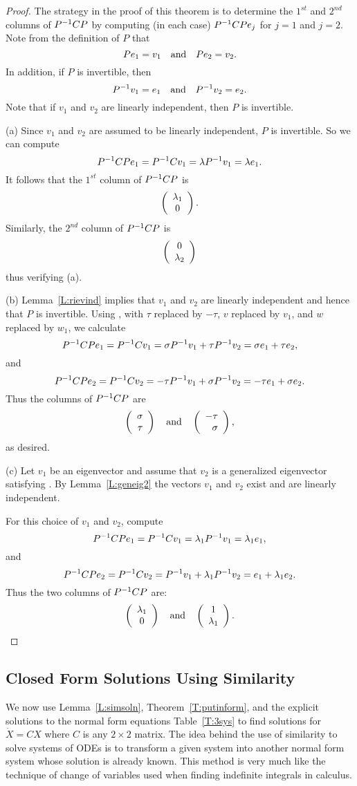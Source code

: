 \documentclass{ximera}
\begin{document}
\begin{proof}
The strategy in the proof of this theorem is to determine the
$1^{st}$ and $2^{nd}$ columns of $P^{-1} CP$ by computing (in each case)
$P^{-1} CPe_j$ for $j=1$ and $j=2$.  Note from the definition of $P$
that
\[
Pe_1 = v_1 \quad\mbox{and}\quad Pe_2 = v_2.
\]
In addition, if $P$ is invertible, then
\[
P^{-1} v_1 = e_1 \quad\mbox{and}\quad P^{-1} v_2 = e_2.
\]
Note that if $v_1$ and $v_2$ are linearly independent, then $P$ is invertible.

(a) \quad Since $v_1$ and $v_2$ are assumed to be linearly independent,
$P$ is invertible.  So we can compute
\[
P^{-1} CPe_1 = P^{-1} C v_1 = \lambda P^{-1} v_1 = \lambda e_1.
\]
It follows that the $1^{st}$ column of $P^{-1} CP$	is
\[
\left(\begin{array}{c} \lambda_1 \\ 0\end{array}\right).
\]
Similarly, the $2^{nd}$ column of $P^{-1} CP$ is
\[
\left(\begin{array}{c} 0 \\ \lambda_2\end{array}\right)
\]
thus verifying (a).

(b) \quad  Lemma~\ref{L:rievind} implies that $v_1$ and $v_2$ are linearly
independent and hence that $P$ is invertible.  Using ,
with $\tau$ replaced by $-\tau$, $v$ replaced by $v_1$, and $w$ replaced by
$w_1$, we calculate
\[
P^{-1} CPe_1 = P^{-1} Cv_1 = \sigma P^{-1} v_1 + \tau P^{-1} v_2
= \sigma e_1 + \tau e_2,
\]
and
\[
P^{-1} CPe_2 = P^{-1} Cv_2 = -\tau P^{-1} v_1 + \sigma P^{-1} v_2
= -\tau e_1 + \sigma e_2.
\]
Thus the columns of $P^{-1} CP$ are
\[
\left(\begin{array}{r} \sigma \\ \tau\end{array}\right) \quad\mbox{and}\quad \left(\begin{array}{r} -\tau \\ \sigma\end{array}\right),
\]
as desired.


(c) \quad   Let $v_1$ be an eigenvector and assume that $v_2$ is a
generalized eigenvector satisfying .  By
Lemma~\ref{L:geneig2} the vectors $v_1$ and $v_2$ exist and are linearly
independent.

For this choice of $v_1$ and $v_2$, compute
\[
P^{-1} CPe_1 = P^{-1} Cv_1 = \lambda_1 P^{-1} v_1 = \lambda_1 e_1,
\]
and
\[
P^{-1} CPe_2 = P^{-1} Cv_2 = P^{-1} v_1+\lambda_1 P^{-1} v_2 = e_1+\lambda_1 e_2.
\]
Thus the two columns of $P^{-1} CP$ are:
\[
\left(\begin{array}{c} \lambda_1 \\ 0\end{array}\right) \quad\mbox{and}\quad \left(\begin{array}{c} 1 \\ \lambda_1\end{array}\right).
\]
  \end{proof}


\subsection*{Closed Form Solutions Using Similarity}

We now use Lemma~\ref{L:simsoln}, Theorem~\ref{T:putinform}, and the
explicit solutions to the normal form equations Table~\ref{T:3sys}
to find solutions for $\dot{X}=CX$ where $C$ is any $2\times 2$ matrix.
The idea behind the use of similarity to solve systems of ODEs is to
transform a given system into another normal form system whose solution is
already known.  This method is very much like the technique of change of
variables used when finding indefinite integrals in calculus.
\end{document}
